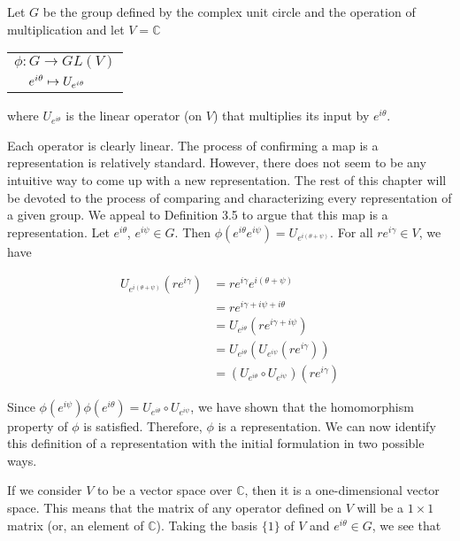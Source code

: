 \begin{example}\end{example}
	Let $G$ be the group defined by the complex unit circle and the operation of multiplication and let $V = \mathbb{C}$ 
	\begin{center}
		 \begin{tabular}{l}$\phi:G\rightarrow GL(V)$\\
				$\hspace{4mm}e^{i\theta}\mapsto U_{e^{i\theta}}$
		\end{tabular}
	\end{center}
	where $U_{e^{i\theta}}$ is the linear operator (on $V$) that multiplies its input by $e^{i\theta}$. 


Each operator is clearly linear. The process of confirming a map is a representation is relatively standard. However, there does not seem to be any intuitive way to come up with a new representation. The rest of this chapter will be devoted to the process of comparing and characterizing every representation of a given group. We appeal to Definition 3.5 to argue that this map is a representation. Let $e^{i\theta}$, $e^{i\psi} \in G$. Then $\phi(e^{i\theta} e^{i\psi}) = U_{e^{i(\theta+\psi)}}$. For all $re^{i\gamma} \in V$, we have

	\begin{equation}
		\begin{aligned}
			U_{e^{i(\theta+\psi)}}(re^{i\gamma}) &= re^{i\gamma}  e^{i(\theta+\psi)} \\
										&= re^{i\gamma + i\psi + i\theta} \\
										&= U_{e^{i\theta}}(re^{i\gamma + i\psi}) \\
										&= U_{e^{i\theta}}(U_{e^{i\psi}}(re^{i\gamma})) \\
										&= (U_{e^{i\theta}}\circ U_{e^{i\psi}}) (re^{i\gamma})
		\end{aligned}
	\end{equation}

Since $\phi(e^{i\psi})\phi(e^{i\theta}) = U_{e^{i\theta}}\circ U_{e^{i\psi}}$, we have shown that the homomorphism property of $\phi$ is satisfied. Therefore, $\phi$ is a representation. We can now identify this definition of a representation with the initial formulation in two possible ways.

If we consider $V$ to be a vector space over $\mathbb{C}$, then it is a one-dimensional vector space. This means that the matrix of any operator defined on $V$ will be a $1\times 1$ matrix (or, an element of $\mathbb{C}$). Taking the basis $\{1\}$ of $V$ and $e^{i\theta} \in G$, we see that 

